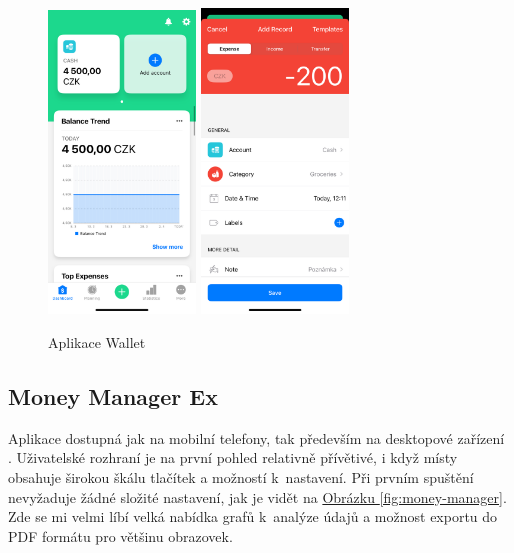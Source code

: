 \documentclass[
  biblatex,
  figures=true,
  tables=false,
  glossaries,
  index
]{kidiplom}
\begin{document}
\begin{figure}
  \centering
  \includegraphics[width=0.35\textwidth]{images/wallet1.PNG}
    \hspace{10px}
    \includegraphics[width=0.35\textwidth]{images/wallet2.PNG}
  \caption{Aplikace Wallet}
  \label{fig:wallet}
\end{figure}

\subsection{Money Manager Ex}
Aplikace dostupná jak na mobilní telefony, tak především na desktopové zařízení \cite{money-manager}. Uživatelské rozhraní je na první pohled relativně přívětivé, i když místy obsahuje širokou škálu tlačítek a možností k~nastavení. Při prvním spuštění nevyžaduje žádné složité nastavení, jak je vidět na \hyperref[fig:money-manager]{Obrázku \ref{fig:money-manager}}. Zde se mi velmi líbí velká nabídka grafů k~analýze údajů a možnost exportu do PDF formátu pro většinu obrazovek.
\end{document}

